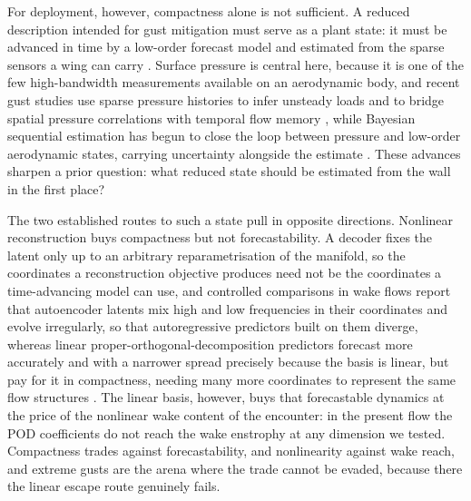 For deployment, however, compactness alone is not sufficient. A reduced description intended for gust mitigation must serve as a plant state: it must be advanced in time by a low-order forecast model and estimated from the sparse sensors a wing can carry \citep{loiseau2018}. Surface pressure is central here, because it is one of the few high-bandwidth measurements available on an aerodynamic body, and recent gust studies use sparse pressure histories to infer unsteady loads and to bridge spatial pressure correlations with temporal flow memory \citep{zhong2023sparse,haughn2024deep,chen2026bridging}, while Bayesian sequential estimation has begun to close the loop between pressure and low-order aerodynamic states, carrying uncertainty alongside the estimate \citep{mousavi2025,eldredge2025guide}. These advances sharpen a prior question: what reduced state should be estimated from the wall in the first place?\re

The two established routes to such a state pull in opposite directions. Nonlinear reconstruction buys compactness but not forecastability. A decoder fixes the latent only up to an arbitrary reparametrisation of the manifold, so the coordinates a reconstruction objective produces need not be the coordinates a time-advancing model can use, and controlled comparisons in wake flows report that autoencoder latents mix high and low frequencies in their coordinates and evolve irregularly, so that autoregressive predictors built on them diverge, whereas linear proper-orthogonal-decomposition predictors forecast more accurately and with a narrower spread precisely because the basis is linear, but pay for it in compactness, needing many more coordinates to represent the same flow structures \citep{solerarico_compactness_underreview}. The linear basis, however, buys that forecastable dynamics at the price of the nonlinear wake content of the encounter: in the present flow the POD coefficients do not reach the wake enstrophy at any dimension we tested. Compactness trades against forecastability, and nonlinearity against wake reach, and extreme gusts are the arena where the trade cannot be evaded, because there the linear escape route genuinely fails.\re


